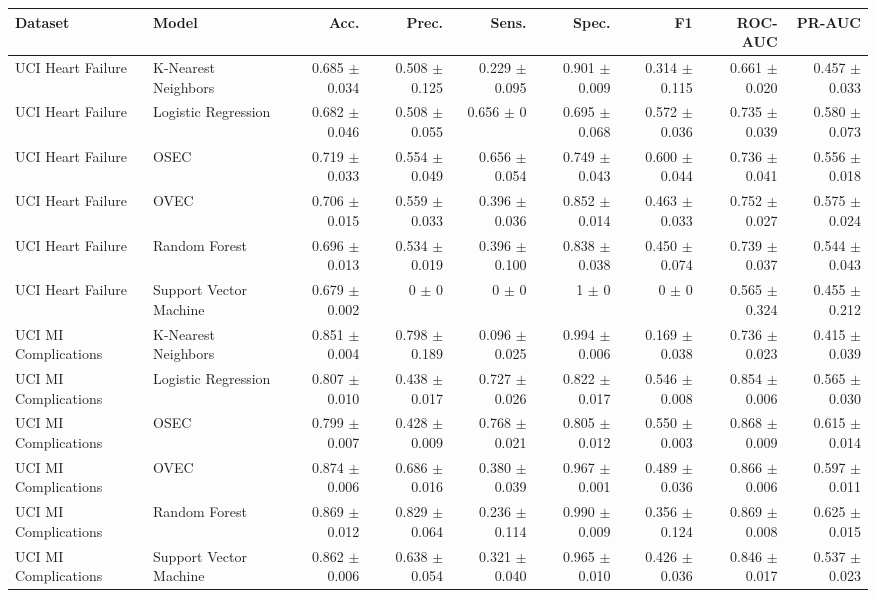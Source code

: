\begin{tabular}{llrrrrrrr}
\toprule
Dataset & Model & Acc. & Prec. & Sens. & Spec. & F1 & ROC-AUC & PR-AUC \\
\midrule
UCI Heart Failure & K-Nearest Neighbors & 0.685 $\pm$ 0.034 & 0.508 $\pm$ 0.125 & 0.229 $\pm$ 0.095 & 0.901 $\pm$ 0.009 & 0.314 $\pm$ 0.115 & 0.661 $\pm$ 0.020 & 0.457 $\pm$ 0.033 \\
UCI Heart Failure & Logistic Regression & 0.682 $\pm$ 0.046 & 0.508 $\pm$ 0.055 & 0.656 $\pm$ 0 & 0.695 $\pm$ 0.068 & 0.572 $\pm$ 0.036 & 0.735 $\pm$ 0.039 & 0.580 $\pm$ 0.073 \\
UCI Heart Failure & OSEC & 0.719 $\pm$ 0.033 & 0.554 $\pm$ 0.049 & 0.656 $\pm$ 0.054 & 0.749 $\pm$ 0.043 & 0.600 $\pm$ 0.044 & 0.736 $\pm$ 0.041 & 0.556 $\pm$ 0.018 \\
UCI Heart Failure & OVEC & 0.706 $\pm$ 0.015 & 0.559 $\pm$ 0.033 & 0.396 $\pm$ 0.036 & 0.852 $\pm$ 0.014 & 0.463 $\pm$ 0.033 & 0.752 $\pm$ 0.027 & 0.575 $\pm$ 0.024 \\
UCI Heart Failure & Random Forest & 0.696 $\pm$ 0.013 & 0.534 $\pm$ 0.019 & 0.396 $\pm$ 0.100 & 0.838 $\pm$ 0.038 & 0.450 $\pm$ 0.074 & 0.739 $\pm$ 0.037 & 0.544 $\pm$ 0.043 \\
UCI Heart Failure & Support Vector Machine & 0.679 $\pm$ 0.002 & 0 $\pm$ 0 & 0 $\pm$ 0 & 1 $\pm$ 0 & 0 $\pm$ 0 & 0.565 $\pm$ 0.324 & 0.455 $\pm$ 0.212 \\
UCI MI Complications & K-Nearest Neighbors & 0.851 $\pm$ 0.004 & 0.798 $\pm$ 0.189 & 0.096 $\pm$ 0.025 & 0.994 $\pm$ 0.006 & 0.169 $\pm$ 0.038 & 0.736 $\pm$ 0.023 & 0.415 $\pm$ 0.039 \\
UCI MI Complications & Logistic Regression & 0.807 $\pm$ 0.010 & 0.438 $\pm$ 0.017 & 0.727 $\pm$ 0.026 & 0.822 $\pm$ 0.017 & 0.546 $\pm$ 0.008 & 0.854 $\pm$ 0.006 & 0.565 $\pm$ 0.030 \\
UCI MI Complications & OSEC & 0.799 $\pm$ 0.007 & 0.428 $\pm$ 0.009 & 0.768 $\pm$ 0.021 & 0.805 $\pm$ 0.012 & 0.550 $\pm$ 0.003 & 0.868 $\pm$ 0.009 & 0.615 $\pm$ 0.014 \\
UCI MI Complications & OVEC & 0.874 $\pm$ 0.006 & 0.686 $\pm$ 0.016 & 0.380 $\pm$ 0.039 & 0.967 $\pm$ 0.001 & 0.489 $\pm$ 0.036 & 0.866 $\pm$ 0.006 & 0.597 $\pm$ 0.011 \\
UCI MI Complications & Random Forest & 0.869 $\pm$ 0.012 & 0.829 $\pm$ 0.064 & 0.236 $\pm$ 0.114 & 0.990 $\pm$ 0.009 & 0.356 $\pm$ 0.124 & 0.869 $\pm$ 0.008 & 0.625 $\pm$ 0.015 \\
UCI MI Complications & Support Vector Machine & 0.862 $\pm$ 0.006 & 0.638 $\pm$ 0.054 & 0.321 $\pm$ 0.040 & 0.965 $\pm$ 0.010 & 0.426 $\pm$ 0.036 & 0.846 $\pm$ 0.017 & 0.537 $\pm$ 0.023 \\

\end{tabular}
